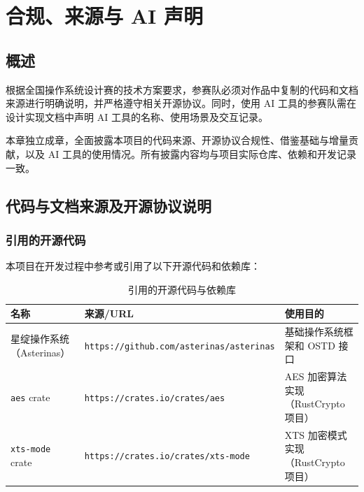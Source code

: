 \chapter{合规、来源与 AI 声明}

\section{概述}

根据全国操作系统设计赛的技术方案要求，参赛队必须对作品中复制的代码和文档来源进行明确说明，并严格遵守相关开源协议。同时，使用 AI 工具的参赛队需在设计实现文档中声明 AI 工具的名称、使用场景及交互记录。

本章独立成章，全面披露本项目的代码来源、开源协议合规性、借鉴基础与增量贡献，以及 AI 工具的使用情况。所有披露内容均与项目实际仓库、依赖和开发记录一致。

\section{代码与文档来源及开源协议说明}

\subsection{引用的开源代码}

本项目在开发过程中参考或引用了以下开源代码和依赖库：

\begin{table}[H]
    \centering
    \small
    \caption{引用的开源代码与依赖库}
    \label{tab:open_source_refs}
    \begin{tabular}{p{}p{}p{}}
        \toprule
        \textbf{名称} & \textbf{来源/URL} & \textbf{使用目的} \\
        \midrule
        星绽操作系统（Asterinas） & \texttt{https://github.com/}\newline\texttt{asterinas/asterinas} & 基础操作系统框架和 OSTD 接口 \\
        \texttt{aes} crate & \texttt{https://crates.io/}\newline\texttt{crates/aes} & AES 加密算法实现（RustCrypto 项目） \\
        \texttt{xts-mode} crate & \texttt{https://crates.io/}\newline\texttt{crates/xts-mode} & XTS 加密模式实现（RustCrypto 项目） \\
        \bottomrule
    \end{tabular}
\end{table}

